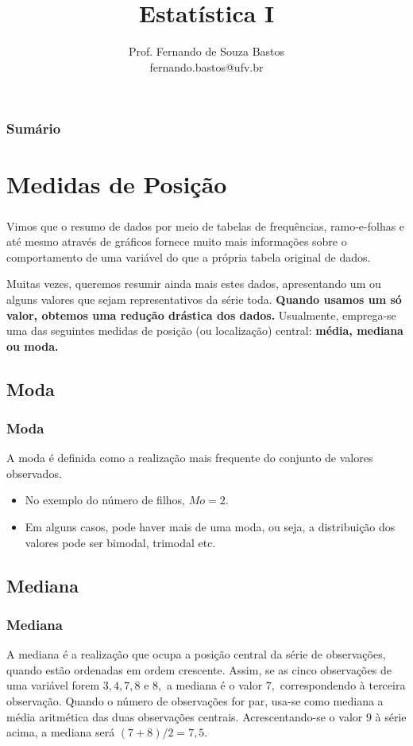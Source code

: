 \documentclass[14pt,aspectratio=1610]{beamer}
\title{Estatística I}
\author{Prof. Fernando de Souza Bastos \texorpdfstring{\\ fernando.bastos@ufv.br}{}}
\institute{Departamento de Estatística \texorpdfstring{\\ Universidade Federal de Viçosa}{}\texorpdfstring{\\ Campus UFV - Viçosa}{}}
\date{}
\begin{document}
%

\frame{\titlepage}

\begin{frame}{}
\frametitle{\bf Sumário}
\tableofcontents
\end{frame}

\section{Medidas de Posição}
\begin{frame}{}
\frametitle{}
\begin{block}{}
\justifying
Vimos que o resumo de dados por meio de tabelas de frequências, ramo-e-folhas e até mesmo através de gráficos fornece muito mais informações sobre o comportamento de uma variável do que a própria tabela original de dados. 
\nocite{Apostila}
\end{block}
\pause
\begin{block}{}
\justifying
Muitas vezes, queremos resumir ainda mais estes dados, apresentando um ou alguns valores que sejam representativos da série toda. \textbf{Quando usamos um só valor, obtemos uma redução drástica dos dados.} Usualmente, emprega-se uma das seguintes medidas de posição (ou localização) central: \bf{média}, \bf{mediana} ou \bf{moda}.
\end{block}
\end{frame}

\subsection{Moda}
\begin{frame}{}
\frametitle{Moda}
\begin{block}{}
\justifying
A moda é definida como a realização mais frequente do conjunto de valores observados.

\begin{itemize}
\item No exemplo do número de filhos, $Mo=2.$\pause
\item Em alguns casos, pode haver 
mais de uma moda, ou seja, a distribuição dos valores pode ser bimodal, trimodal etc.
\end{itemize}
\end{block}
\end{frame}
\subsection{Mediana}
\begin{frame}{}
\frametitle{Mediana}
\begin{block}{}
\justifying
A mediana é a realização que ocupa a posição central da série de observações, quando
estão ordenadas em ordem crescente. Assim, se as cinco observações de uma variável forem $3, 4, 7, 8$ e $8,$ a mediana é o valor $7,$ correspondendo à terceira 
observação. Quando o número de observações for par, usa-se como mediana a média aritmética das duas observações centrais. Acrescentando-se o valor $9$ à série acima, a mediana será $(7 + 8)/2 = 7,5.$
\end{block}
\end{frame}
\end{document}
